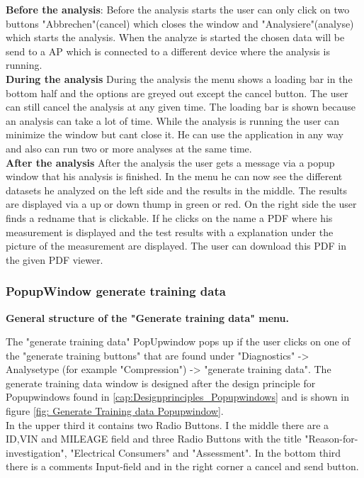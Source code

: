 \documentclass{scrreprt}
\begin{document}
\textbf{Before the analysis}: 
Before the analysis starts the user can only click on two buttons "Abbrechen"(cancel) which closes the window and "Analysiere"(analyse) which starts the analysis. When the analyze is started the chosen data will be send to a AP which is connected to a different device where the analysis is running. \\

\textbf{During the analysis}
During the analysis the menu shows a loading bar in the bottom half and the options are greyed out except the cancel button. The user can still cancel the analysis at any given time. 
The loading bar is shown because an analysis can take a lot of time. While the analysis is running the user can minimize the window but cant close it. He can use the application in any way and also can run two or more analyses at the same time.\\

\textbf{After the analysis}
After the analysis the user gets a message via a popup window that his analysis is finished. In the menu he can now see the different datasets he analyzed on the left side and the results in the middle. 
The results are displayed via a up or down thump in green or red. On the right side the user finds a redname that is clickable. If he clicks on the name a PDF where his measurement is displayed and the test results with a explanation under the picture of the measurement are displayed. The user can download this PDF in the given PDF viewer.  



\subsubsection{PopupWindow generate training data}\label{cap: PopupWindow_generate_training_data}

\textbf{General structure of the "Generate training data" menu.} 

The "generate training data" PopUpwindow pops up if the user clicks on one of the "generate training buttons" that are found under "Diagnostics" -> Analysetype (for example "Compression") -> "generate training data". The generate training data window is designed after the design principle for Popupwindows found in \ref{cap:Designprinciples_Popupwindows} and is shown in figure \ref{fig: Generate Training data Popupwindow}.\\  In the upper third it contains two Radio Buttons. I the middle there are a ID,VIN and MILEAGE field and three Radio Buttons with the title "Reason-for-investigation", "Electrical Consumers" and "Assessment". In the bottom third there is a comments Input-field and in the right corner a cancel and send button. 
\end{document}
